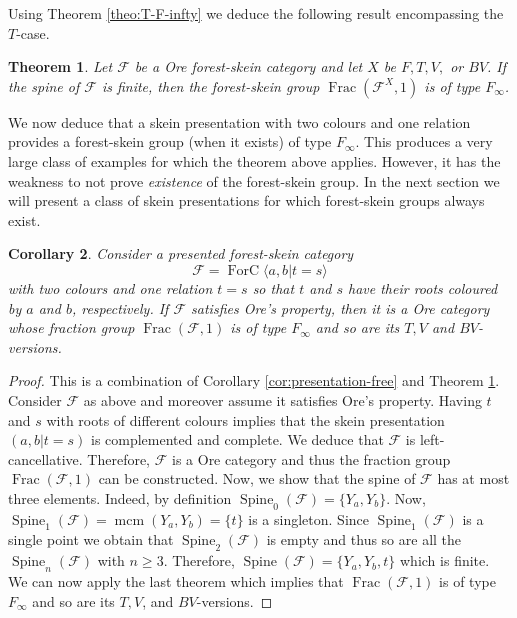 \documentclass[a4paper, 12pt]{amsart}
\numberwithin{equation}{section}
\newtheorem{theorem}{Theorem}[section]
\newtheorem{corollary}[theorem]{Corollary}
\theoremstyle{definition}
\newcommand{\cF}{\mathcal F}
\DeclareMathOperator{\Frac}{Frac}
\DeclareMathOperator{\FC}{ForC}
\newcommand{\la}{\langle}
\DeclareMathOperator{\mcm}{mcm}
\newcommand{\ra}{\rangle}
\DeclareMathOperator{\Sp}{Spine}
\begin{document}
Using Theorem \ref{theo:T-F-infty} we deduce the following result encompassing the $T$-case.

\begin{theorem}\label{theo:Finfty}
Let $\cF$ be a Ore forest-skein category and let $X$ be $F,T,V,$ or $BV$.
If the spine of $\cF$ is finite, then the forest-skein group $\Frac(\cF^X,1)$ is of type $F_\infty$.
\end{theorem}

We now deduce that a skein presentation with two colours and one relation provides a forest-skein group (when it exists) of type $F_\infty$. This produces a very large class of examples for which the theorem above applies. However, it has the weakness to not prove {\it existence} of the forest-skein group. 
In the next section we will present a class of skein presentations for which forest-skein groups always exist.

\begin{corollary}
Consider a presented forest-skein category 
$$\cF=\FC\la a,b| t=s\ra$$ 
with two colours and one relation $t=s$ so that $t$ and $s$ have their roots coloured by $a$ and $b$, respectively.
If $\cF$ satisfies Ore's property, then it is a Ore category whose fraction group $\Frac(\cF,1)$ is of type $F_\infty$ and so are its $T,V$ and $BV$-versions.
\end{corollary}

\begin{proof}
This is a combination of Corollary \ref{cor:presentation-free} and Theorem \ref{theo:Finfty}.
Consider $\cF$ as above and moreover assume it satisfies Ore's property.
Having $t$ and $s$ with roots of different colours implies that the skein presentation $(a,b|t=s)$ is complemented and complete. We deduce that $\cF$ is left-cancellative.
Therefore, $\cF$ is a Ore category and thus the fraction group $\Frac(\cF,1)$ can be constructed.
Now, we show that the spine of $\cF$ has at most three elements.
Indeed, by definition $\Sp_0(\cF)=\{Y_a,Y_b\}$.
Now, $\Sp_1(\cF)=\mcm(Y_a,Y_b)=\{t\}$ is a singleton. 
Since $\Sp_1(\cF)$ is a single point we obtain that $\Sp_2(\cF)$ is empty and thus so are all the $\Sp_n(\cF)$ with $n\geq 3.$
Therefore, $\Sp(\cF)=\{Y_a,Y_b,t\}$ which is finite. 
We can now apply the last theorem which implies that $\Frac(\cF,1)$ is of type $F_\infty$ and so are its $T,V$, and $BV$-versions.
\end{proof}
\end{document}
